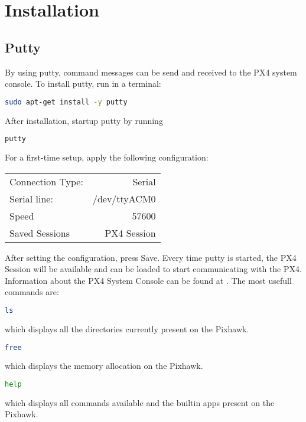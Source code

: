 \chapter{Installation}

\section{Putty}
By using putty, command messages can be send and received to the PX4 system console. To install putty, run in a terminal:
\begin{lstlisting}[language=sh]
sudo apt-get install -y putty
\end{lstlisting}
After installation, startup putty by running
\begin{lstlisting}[language=sh]
putty
\end{lstlisting}
For a first-time setup, apply the following configuration:
\begin{table}[H]
	\centering
	\begin{tabular}{l r}
		Connection Type: & Serial\\
		Serial line:	& /dev/ttyACM0\\
		Speed			& 57600\\
		Saved Sessions & PX4 Session\\
	\end{tabular}
\end{table}
After setting the configuration, press Save. Every time putty is started, the PX4 Session will be available and can be loaded to start communicating with the PX4.\\
Information about the PX4 System Console can be found at \cite{NSH}. The most usefull commands are:
\begin{lstlisting}[language=sh]
ls
\end{lstlisting}
which displays all the directories currently present on the Pixhawk.
\begin{lstlisting}[language=sh]
free
\end{lstlisting}
which displays the memory allocation on the Pixhawk.
\begin{lstlisting}[language=sh]
help
\end{lstlisting}
which displays all commands available and the builtin apps present on the Pixhawk.
